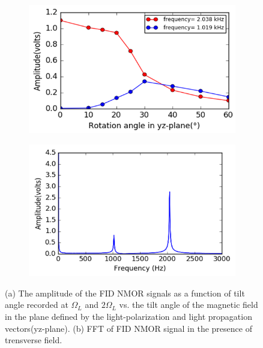 \documentclass[12pt]{report}
\begin{document}
\begin{figure}
    \centering
   \begin{subfigure}[b]{0.45\textwidth}
        \centering
        \includegraphics[width=\textwidth]{figures/amp_tiltangle}
        \caption{}
        \label{fig:y equals x}
    \end{subfigure}
    \hfill
     \begin{subfigure}[b]{0.45\textwidth}
        \centering
        \includegraphics[width=\textwidth]{figures/tansverse_field_fft}
        \caption{}
        \label{fig:three sin x}
    \end{subfigure}
    \caption{(a) The amplitude of the FID NMOR signals as a function of tilt angle recorded at $\Omega_L$ and $2\Omega_L$ vs. the tilt angle of the magnetic field in the plane defined by the light-polarization and light propagation vectors(yz-plane). (b) FFT of FID NMOR signal in the presence of trensverse field.}
\end{figure}
\end{document}
